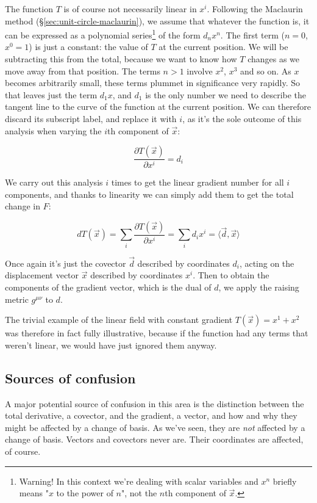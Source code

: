 The function $T$ is of course not necessarily linear in $x^i$. Following the Maclaurin method (§\ref{sec:unit-circle-maclaurin}), we assume that whatever the function is, it can be expressed as a polynomial series\footnote{Warning! In this context we're dealing with scalar variables and $x^n$ briefly means "$x$ to the power of $n$", not the $n$th component of $\vec{x}$.} of the form $d_n x^n$. The first term ($n = 0$, $x^0 = 1$) is just a constant: the value of $T$ at the current position. We will be subtracting this from the total, because we want to know how $T$ changes as we move away from that position. The terms $n > 1$ involve $x^2$, $x^3$ and so on. As $x$ becomes arbitrarily small, these terms plummet in significance very rapidly. So that leaves just the term $d_1 x$, and $d_1$ is the only number we need to describe the tangent line to the curve of the function at the current position. We can therefore discard its subscript label, and replace it with $i$, as it's the sole outcome of this analysis when varying the $i$th component of $\vec{x}$:

$$
\frac{\partial T(\vec{x})}{\partial x^i} = d_i
$$

We carry out this analysis $i$ times to get the linear gradient number for all $i$ components, and thanks to linearity we can simply add them to get the total change in $F$:

$$
d T(\vec{x}) = \sum_i \frac{\partial T(\vec{x})}{\partial x^i}
= \sum_i d_i x^i
= \langle \vec{d} , \vec{x} \rangle
$$

Once again it's just the covector $\vec{d}$ described by coordinates $d_i$, acting on the displacement vector $\vec{x}$ described by coordinates $x^i$. Then to obtain the components of the gradient vector, which is the dual of $d$, we apply the raising metric $g^{\mu\nu}$ to $d$.

The trivial example of the linear field with constant gradient $T(\vec{x}) = x^1 + x^2$ was therefore in fact fully illustrative, because if the function had any terms that weren't linear, we would have just ignored them anyway.

\subsection{Sources of confusion}

A major potential source of confusion in this area is the distinction between the total derivative, a covector, and the gradient, a vector, and how and why they might be affected by a change of basis. As we've seen, they are \textit{not} affected by a change of basis. Vectors and covectors never are. Their coordinates are affected, of course.

